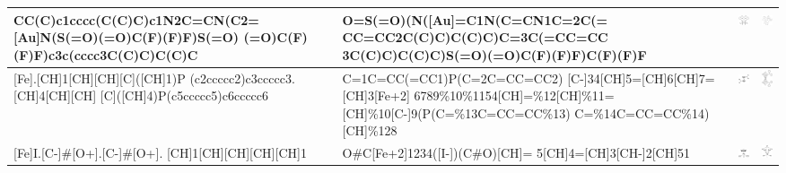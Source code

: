 \begin{landscape}
\begin{longtable}{m{7cm}m{8cm}m{2.3cm}m{2.3cm}}
 CC(C)c1cccc(C(C)C)c1N2C=CN(C2= [Au]N(S(=O)(=O)C(F)(F)F)S(=O) (=O)C(F)(F)F)c3c(cccc3C(C)C)C(C)C & 
 O=S(=O)(N([Au]=C1N(C=CN1C=2C(= CC=CC2C(C)C)C(C)C)C=3C(=CC=CC 3C(C)C)C(C)C)S(=O)(=O)C(F)(F)F)C(F)(F)F & 
 \includegraphics[width=2.1cm]{imagenes/sigmaAldrich/IPrAuNTf2.png} & 
 \includegraphics[width=2.2cm]{imagenes/sciFinder/pdf/IPrAuNTf2.pdf} \\
\hline

 [Fe].[CH]1[CH][CH][C]([CH]1)P (c2ccccc2)c3ccccc3.[CH]4[CH][CH] [C]([CH]4)P(c5ccccc5)c6ccccc6 & 
 C=1C=CC(=CC1)P(C=2C=CC=CC2) [C-]34[CH]5=[CH]6[CH]7=[CH]3[Fe+2] 6789\%10\%1154[CH]=\%12[CH]\%11= [CH]\%10[C-]9(P(C=\%13C=CC=CC\%13) C=\%14C=CC=CC\%14)[CH]\%128 & 
 \includegraphics[width=2.2cm]{imagenes/sigmaAldrich/DPPF.png} & 
 \includegraphics[width=2.2cm]{imagenes/sciFinder/pdf/DPPF.pdf} \\
\hline

 [Fe]I.[C-]\#[O+].[C-]\#[O+]. [CH]1[CH][CH][CH][CH]1 & 
 O\#C[Fe+2]1234([I-])(C\#O)[CH]= 5[CH]4=[CH]3[CH-]2[CH]51 & 
 \includegraphics[width=2.2cm]{imagenes/sigmaAldrich/Dicarbonylcyclopentadienyliodoiron(II).png} & 
 \includegraphics[width=2.2cm]{imagenes/sciFinder/pdf/Dicarbonylcyclopentadienyliodoiron(II).pdf} \\
\hline


\end{longtable}
\end{landscape}
